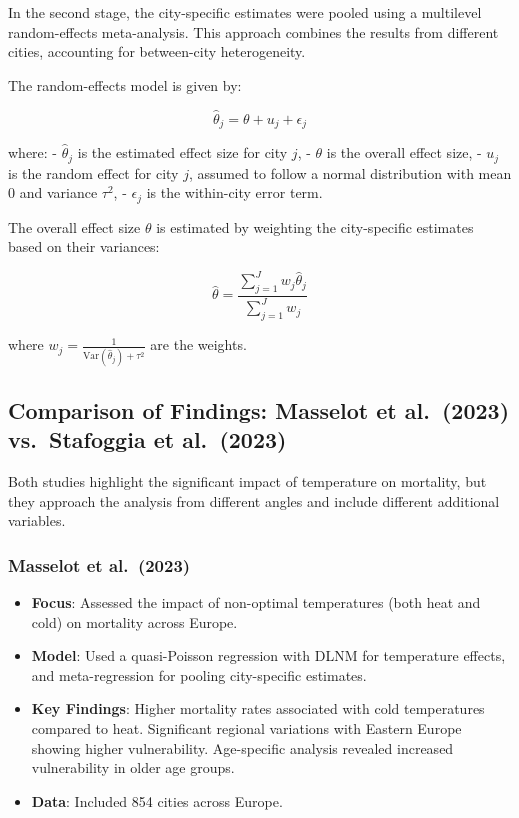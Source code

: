 \documentclass[
]{krantz}
\providecommand{\tightlist}{%
  \setlength{\itemsep}{0pt}\setlength{\parskip}{0pt}}
\begin{document}
In the second stage, the city-specific estimates were pooled using a multilevel random-effects meta-analysis. This approach combines the results from different cities, accounting for between-city heterogeneity.

The random-effects model is given by:

\[ \hat{\theta}_j = \theta + u_j + \epsilon_j \]

where:
- \(\hat{\theta}_j\) is the estimated effect size for city \(j\),
- \(\theta\) is the overall effect size,
- \(u_j\) is the random effect for city \(j\), assumed to follow a normal distribution with mean 0 and variance \(\tau^2\),
- \(\epsilon_j\) is the within-city error term.

The overall effect size \(\theta\) is estimated by weighting the city-specific estimates based on their variances:

\[ \hat{\theta} = \frac{\sum_{j=1}^{J} w_j \hat{\theta}_j}{\sum_{j=1}^{J} w_j} \]

where \(w_j = \frac{1}{\text{Var}(\hat{\theta}_j) + \tau^2}\) are the weights.

\subsection{Comparison of Findings: Masselot et al.~(2023) vs.~Stafoggia et al.~(2023)}\label{comparison-of-findings-masselot-et-al.-2023-vs.-stafoggia-et-al.-2023}

Both studies highlight the significant impact of temperature on mortality, but they approach the analysis from different angles and include different additional variables.

\subsubsection{\texorpdfstring{Masselot et al.~(2023) \citep{masselot2023}}{Masselot et al.~(2023) {[}@masselot2023{]}}}\label{masselot-et-al.-2023-masselot2023}

\begin{itemize}
\tightlist
\item
  \textbf{Focus}: Assessed the impact of non-optimal temperatures (both heat and cold) on mortality across Europe.
\item
  \textbf{Model}: Used a quasi-Poisson regression with DLNM for temperature effects, and meta-regression for pooling city-specific estimates.
\item
  \textbf{Key Findings}: Higher mortality rates associated with cold temperatures compared to heat. Significant regional variations with Eastern Europe showing higher vulnerability. Age-specific analysis revealed increased vulnerability in older age groups.
\item
  \textbf{Data}: Included 854 cities across Europe.
\end{itemize}
\end{document}
